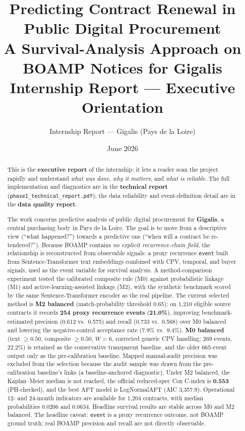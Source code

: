 \documentclass[11pt,a4paper]{article}
\title{\textbf{Predicting Contract Renewal in Public Digital Procurement}\\[0.4em]
      \large A Survival-Analysis Approach on BOAMP Notices for Gigalis\\[0.3em]
      \normalsize Internship Report --- Executive Orientation}
\author{Internship Report --- Gigalis (Pays de la Loire)}
\date{June 2026}
\begin{document}
\maketitle
\thispagestyle{fancy}

\begin{abstract}
\noindent
This is the \textbf{executive report} of the internship: it lets a reader scan
the project rapidly and understand \emph{what was done}, \emph{why it matters},
and \emph{what is reliable}. The full implementation and diagnostics are in the
\textbf{technical report} (\texttt{phase1\_technical\_report.pdf}); the data
reliability and event-definition detail are in the \textbf{data quality report}.

The work concerns predictive analysis of public digital procurement for
\textbf{Gigalis}, a central purchasing body in Pays de la Loire. The goal is to
move from a descriptive view (``what happened?'') towards a predictive one
(``when will a contract be re-tendered?''). Because BOAMP contains \emph{no
explicit recurrence-chain field}, the relationship is reconstructed from
observable signals: a proxy recurrence \texttt{event} built from
Sentence-Transformer text embeddings combined with CPV, temporal, and buyer
signals, used as the event variable for survival analysis. A method-comparison
experiment tested the calibrated composite rule (M0) against probabilistic
linkage (M1) and active-learning-assisted linkage (M2), with the synthetic
benchmark scored by the same Sentence-Transformer encoder as the real
pipeline. The current selected method is \textbf{M2 balanced}
(match-probability threshold 0.65): on 1{,}210 eligible source contracts it
records \textbf{254 proxy recurrence events} (\textbf{21.0\%}), improving
benchmark-estimated precision (0.612 vs.\ 0.575) and recall (0.733 vs.\ 0.568)
over M0 balanced and lowering the negative-control acceptance rate (7.9\% vs.\
9.4\%). \textbf{M0 balanced} (text $\geq 0.50$, composite $\geq 0.50$, $W=6$,
corrected generic CPV handling; 269 events, 22.2\%) is retained as the
conservative transparent baseline, and the older 665-event output only as the
pre-calibration baseline. Mapped manual-audit precision was excluded from the
selection because the audit sample was drawn from the pre-calibration
baseline's links (a baseline-anchored diagnostic). Under M2 balanced, the
Kaplan--Meier median is not reached, the official reduced-spec Cox C-index is
\textbf{0.553} (PH-checked), and the best AFT model is LogNormalAFT (AIC
3{,}357.9). Operational 12- and 24-month indicators are available for 1{,}204
contracts, with median probabilities 0.0206 and 0.0634. Headline survival
results are stable across M0 and M2 balanced. The headline caveat:
\texttt{event} is a proxy recurrence outcome, not BOAMP ground truth; real
BOAMP precision and recall are not directly observable.
\end{abstract}
\end{document}
